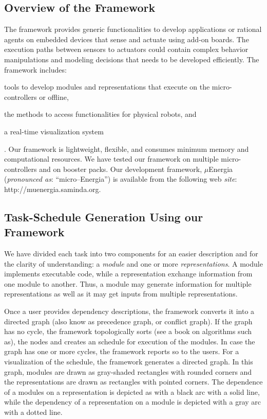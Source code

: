 \documentclass[]{IEEEtran}
\begin{document}
\subsection{Overview of the Framework}
\label{sec:OverviewOfTheFramework}

\par
The framework provides generic functionalities to develop applications or
rational agents on embedded devices that sense and actuate using add-on boards.
The execution paths between sensors to actuators could contain complex behavior
manipulations and modeling decisions that needs to be developed efficiently.
The framework includes: \begin{inparaenum}[($i$)] \item tools to develop
modules and representations that execute on the micro-controllers or offline,
\item the methods to access functionalities for physical robots, and \item a
real-time visualization system\end{inparaenum}. Our framework is lightweight,
flexible, and consumes minimum memory and computational resources. We have
tested our framework on multiple micro-controllers and on booster packs.  Our
development framework, $\mu$Energia (\textit{pronounced as}:
``micro--Energia'') is available from the following web \textit{site}:
{http://muenergia.saminda.org}.

\subsection{Task-Schedule Generation Using our Framework}
\label{FrameWorkDescription}


We have divided each task into two components for an easier description and for
the clarity of understanding: a {\em module} and one or more {\em
representations}. A module implements executable code, while a representation
exchange information from one module to another. Thus, a module may generate
information for multiple representations as well as it may get inputs from
multiple representations.  \par Once a user provides dependency descriptions,
the framework converts it  into a directed graph (also know as precedence
graph, or conflict graph).  If the graph has no cycle, the framework
topologically sorts (see a book on algorithms such
as\cite{Cormen:AlgorithmBook}), the nodes and creates an schedule for execution
of the modules. In case the graph has one or more cycles, the framework reports
so to the users.  For a visualization of the schedule, the framework  generates
a directed graph. In this graph, modules are drawn as gray-shaded rectangles
with rounded corners and the representations are drawn as rectangles with pointed corners. The dependence of a modules on a
representation is depicted as with a black arc with a solid line, while the
dependency of a representation on a module is depicted with a gray arc with a
dotted line. 
\end{document}
